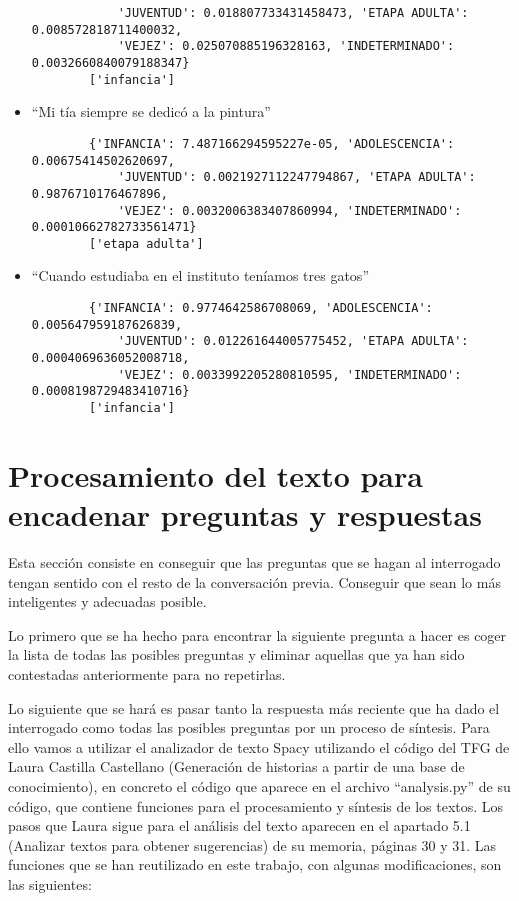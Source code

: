 \begin{itemize}
\begin{verbatim}
			'JUVENTUD': 0.018807733431458473, 'ETAPA ADULTA': 0.008572818711400032, 
			'VEJEZ': 0.025070885196328163, 'INDETERMINADO': 0.0032660840079188347}
		['infancia']
	\end{verbatim}
	\item ``Mi tía siempre se dedicó a la pintura''
	\begin{verbatim}
		{'INFANCIA': 7.487166294595227e-05, 'ADOLESCENCIA': 0.00675414502620697, 
			'JUVENTUD': 0.0021927112247794867, 'ETAPA ADULTA': 0.9876710176467896, 
			'VEJEZ': 0.0032006383407860994, 'INDETERMINADO': 0.00010662782733561471}
		['etapa adulta']
	\end{verbatim}
	\item ``Cuando estudiaba en el instituto teníamos tres gatos''
	\begin{verbatim}
		{'INFANCIA': 0.9774642586708069, 'ADOLESCENCIA': 0.005647959187626839, 
			'JUVENTUD': 0.012261644005775452, 'ETAPA ADULTA': 0.0004069636052008718, 
			'VEJEZ': 0.0033992205280810595, 'INDETERMINADO': 0.0008198729483410716}
		['infancia']
	\end{verbatim}
	
\end{itemize}



\section{Procesamiento del texto para encadenar preguntas y respuestas}
 
Esta sección consiste en conseguir que las preguntas que se hagan al interrogado tengan sentido con el resto de la conversación previa. Conseguir que sean lo más inteligentes y adecuadas posible. 

Lo primero que se ha hecho para encontrar la siguiente pregunta a hacer es coger la lista de todas las posibles preguntas y eliminar aquellas que ya han sido contestadas anteriormente para no repetirlas. 

Lo siguiente que se hará es pasar tanto la respuesta más reciente que ha dado el interrogado como todas las posibles preguntas por un proceso de síntesis. Para ello vamos a utilizar el analizador de texto Spacy utilizando el código del TFG de Laura Castilla Castellano (Generación de historias a partir de una base de conocimiento), en concreto el código que aparece en el archivo ``analysis.py'' de su código, que contiene funciones para el procesamiento y síntesis de los textos. Los pasos que Laura sigue para el análisis del texto aparecen en el apartado 5.1 (Analizar textos para obtener sugerencias) de su memoria, páginas 30 y 31. Las funciones que se han reutilizado en este trabajo, con algunas modificaciones, son las siguientes:

